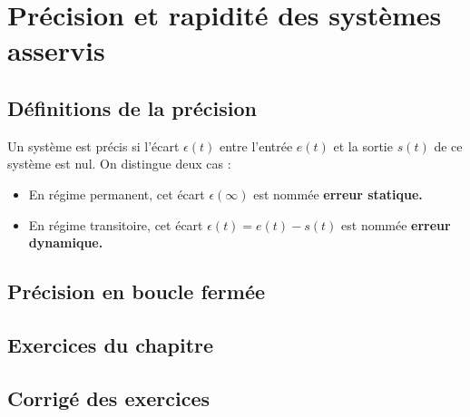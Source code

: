 \chapter{Précision et rapidité des systèmes asservis\label{chap-perf}}

\minitoc
\newpage

\section{Définitions de la précision}

Un système est précis si l'écart $\epsilon(t)$ entre l'entrée $e(t)$ et la sortie $s(t)$ 
de ce système est nul.
On distingue deux cas :
\begin{itemize}
    \item En régime permanent, cet écart $\epsilon(\infty)$ est nommée \textbf{erreur statique.}
    \item En régime transitoire, cet écart $\epsilon(t)=e(t)-s(t)$ est nommée \textbf{erreur dynamique.}
\end{itemize}

\section{Précision en boucle fermée}

\newpage
\section*{Exercices du chapitre}


\exercice{}
\question

\newpage
\section*{Corrigé des exercices}


